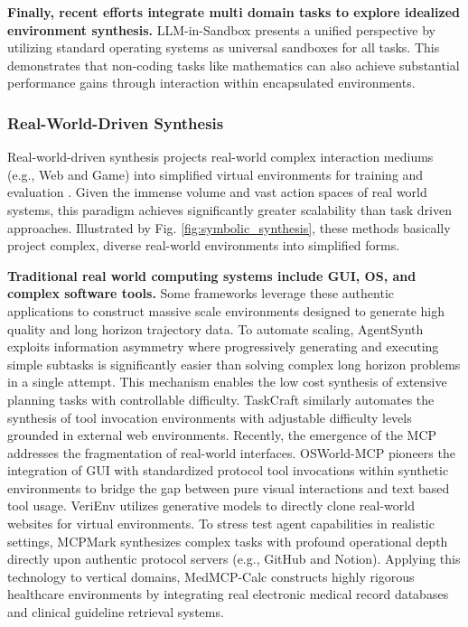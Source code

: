 \documentclass{llmxive}
\begin{document}
\textbf{Finally, recent efforts integrate multi domain tasks to explore idealized environment synthesis.} LLM-in-Sandbox \cite{LLM-in-Sandbox} presents a unified perspective by utilizing standard operating systems as universal sandboxes for all tasks. This demonstrates that non-coding tasks like mathematics can also achieve substantial performance gains through interaction within encapsulated environments.

\subsubsection{Real-World-Driven Synthesis}
\label{sec:real world driven synthesis}

Real-world-driven synthesis projects real-world complex interaction mediums (e.g., Web and Game) into simplified virtual environments for training and evaluation \cite{AgentSynth, AI_GAMESTORE, LMGAME-BENCH, GameDevBench, VeriEnv, AutoWebWorld, GLM-5, MiMo-V2-Flash, DIVE, KAT-Coder-V2}. Given the immense volume and vast action spaces of real world systems, this paradigm achieves significantly greater scalability than task driven approaches. Illustrated by Fig. \ref{fig:symbolic_synthesis}, these methods basically project complex, diverse real-world environments into simplified forms.


\textbf{Traditional real world computing systems include GUI, OS, and complex software tools.} Some frameworks leverage these authentic applications to construct massive scale environments \cite{Agent2World, SWE-Universe} designed to generate high quality and long horizon trajectory data. To automate scaling, AgentSynth \cite{AgentSynth} exploits information asymmetry where progressively generating and executing simple subtasks is significantly easier than solving complex long horizon problems in a single attempt. This mechanism enables the low cost synthesis of extensive planning tasks with controllable difficulty. TaskCraft \cite{TaskCraft} similarly automates the synthesis of tool invocation environments with adjustable difficulty levels grounded in external web environments. Recently, the emergence of the MCP addresses the fragmentation of real-world interfaces. OSWorld-MCP \cite{OSWorld-MCP} pioneers the integration of GUI with standardized protocol tool invocations within synthetic environments to bridge the gap between pure visual interactions and text based tool usage. VeriEnv \cite{VeriEnv} utilizes generative models to directly clone real-world websites for virtual environments. To stress test agent capabilities in realistic settings, MCPMark \cite{MCPMark} synthesizes complex tasks with profound operational depth directly upon authentic protocol servers (e.g., GitHub and Notion). Applying this technology to vertical domains, MedMCP-Calc \cite{MedMCP-Calc} constructs highly rigorous healthcare environments by integrating real electronic medical record databases and clinical guideline retrieval systems. 
\end{document}
